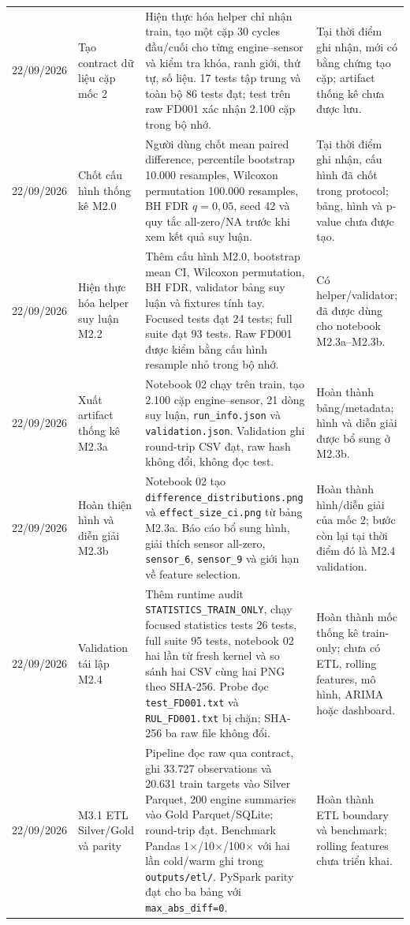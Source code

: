 \begin{longtable}{L{2cm}L{3.2cm}L{5.8cm}L{3.3cm}}
22/09/2026 & Tạo contract dữ liệu cặp mốc 2 & Hiện thực hóa helper chỉ nhận train, tạo một cặp 30 cycles đầu/cuối cho từng engine--sensor và kiểm tra khóa, ranh giới, thứ tự, số liệu. 17 tests tập trung và toàn bộ 86 tests đạt; test trên raw FD001 xác nhận 2.100 cặp trong bộ nhớ. & Tại thời điểm ghi nhận, mới có bằng chứng tạo cặp; artifact thống kê chưa được lưu.\\
22/09/2026 & Chốt cấu hình thống kê M2.0 & Người dùng chốt mean paired difference, percentile bootstrap 10.000 resamples, Wilcoxon permutation 100.000 resamples, BH FDR $q=0{,}05$, seed 42 và quy tắc all-zero/NA trước khi xem kết quả suy luận. & Tại thời điểm ghi nhận, cấu hình đã chốt trong protocol; bảng, hình và p-value chưa được tạo.\\
22/09/2026 & Hiện thực hóa helper suy luận M2.2 & Thêm cấu hình M2.0, bootstrap mean CI, Wilcoxon permutation, BH FDR, validator bảng suy luận và fixtures tính tay. Focused tests đạt 24 tests; full suite đạt 93 tests. Raw FD001 được kiểm bằng cấu hình resample nhỏ trong bộ nhớ. & Có helper/validator; đã được dùng cho notebook M2.3a--M2.3b.\\
22/09/2026 & Xuất artifact thống kê M2.3a & Notebook 02 chạy trên train, tạo 2.100 cặp engine--sensor, 21 dòng suy luận, \texttt{run\_info.json} và \texttt{validation.json}. Validation ghi round-trip CSV đạt, raw hash không đổi, không đọc test. & Hoàn thành bảng/metadata; hình và diễn giải được bổ sung ở M2.3b.\\
22/09/2026 & Hoàn thiện hình và diễn giải M2.3b & Notebook 02 tạo \texttt{difference\_distributions.png} và \texttt{effect\_size\_ci.png} từ bảng M2.3a. Báo cáo bổ sung hình, giải thích sensor all-zero, \texttt{sensor\_6}, \texttt{sensor\_9} và giới hạn về feature selection. & Hoàn thành hình/diễn giải của mốc 2; bước còn lại tại thời điểm đó là M2.4 validation.\\
22/09/2026 & Validation tái lập M2.4 & Thêm runtime audit \texttt{STATISTICS\_TRAIN\_ONLY}, chạy focused statistics tests 26 tests, full suite 95 tests, notebook 02 hai lần từ fresh kernel và so sánh hai CSV cùng hai PNG theo SHA-256. Probe đọc \texttt{test\_FD001.txt} và \texttt{RUL\_FD001.txt} bị chặn; SHA-256 ba raw file không đổi. & Hoàn thành mốc thống kê train-only; chưa có ETL, rolling features, mô hình, ARIMA hoặc dashboard.\\
22/09/2026 & M3.1 ETL Silver/Gold và parity & Pipeline đọc raw qua contract, ghi 33.727 observations và 20.631 train targets vào Silver Parquet, 200 engine summaries vào Gold Parquet/SQLite; round-trip đạt. Benchmark Pandas 1$\times$/10$\times$/100$\times$ với hai lần cold/warm ghi trong \texttt{outputs/etl/}. PySpark parity đạt cho ba bảng với \texttt{max\_abs\_diff=0}. & Hoàn thành ETL boundary và benchmark; rolling features chưa triển khai.\\

\end{longtable}
